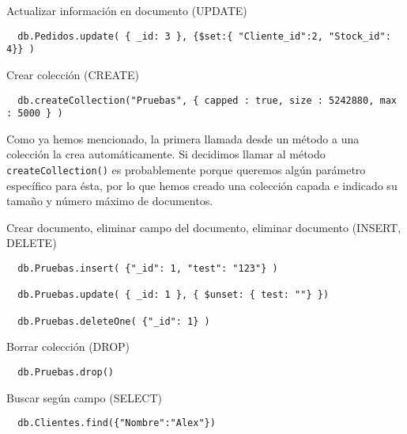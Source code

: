\pagebreak
\bigskip
{\large Actualizar información en documento (UPDATE)}

  \begin{lstlisting}
  db.Pedidos.update( { _id: 3 }, {$set:{ "Cliente_id":2, "Stock_id": 4}} )
  \end{lstlisting}

\bigskip
{\large Crear colección (CREATE)}

  \begin{lstlisting}
  db.createCollection("Pruebas", { capped : true, size : 5242880, max : 5000 } )
  \end{lstlisting}

  Como ya hemos mencionado, la primera llamada desde un método a una colección la crea automáticamente. Si decidimos llamar al método \texttt{createCollection()} es probablemente porque queremos algún parámetro específico para ésta, por lo que hemos creado una colección capada e indicado su tamaño y número máximo de documentos.

\bigskip
{\large Crear documento, eliminar campo del documento, eliminar documento (INSERT, DELETE)}

  \begin{lstlisting}
  db.Pruebas.insert( {"_id": 1, "test": "123"} )

  db.Pruebas.update( { _id: 1 }, { $unset: { test: ""} })

  db.Pruebas.deleteOne( {"_id": 1} )
  \end{lstlisting}

\bigskip
{\large Borrar colección (DROP)}

  \begin{lstlisting}
  db.Pruebas.drop()
  \end{lstlisting}

\bigskip
{\large Buscar según campo (SELECT)}

  \begin{lstlisting}
  db.Clientes.find({"Nombre":"Alex"})
  \end{lstlisting}
